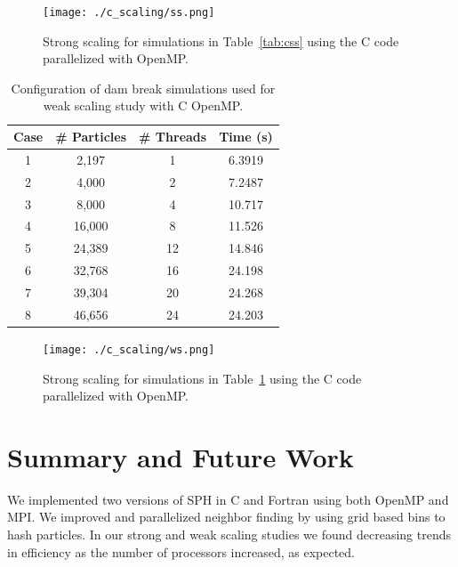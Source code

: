 \documentclass{scrartcl}
\begin{document}
    
        \begin{figure}[h!]
        	\begin{center}
        		\texttt{[image: ./c\_scaling/ss.png]}
        		\caption{Strong scaling for simulations in Table~\ref{tab:css} using the C code parallelized with OpenMP.}
        		\label{fig:ss_c_omp}
        	\end{center}
        \end{figure}

            \begin{table}[h!]
            	\begin{center}
            		\begin{tabular}{| c | c | c | c |}
            			\hline
            			Case & \# Particles & \# Threads & Time (s) \\ \hline
            			1 &  2,197 &  1 & 6.3919 \\ \hline		  		
            			2 &  4,000 &  2 & 7.2487 \\ \hline		  		
            			3 &  8,000 &  4 & 10.717 \\ \hline		  		
            			4 & 16,000 &  8 & 11.526 \\ \hline		  		
            			5 & 24,389 & 12 & 14.846 \\ \hline		  		
            			6 & 32,768 & 16 & 24.198 \\ \hline		  		
            			7 & 39,304 & 20 & 24.268 \\ \hline		  		
            			8 & 46,656 & 24 & 24.203 \\ \hline		  		
            		\end{tabular}
            		\caption{Configuration of dam break simulations used for weak scaling study with C OpenMP.}
            		\label{tab:cws}
            	\end{center}
            \end{table}
    \begin{figure}[h!]
    	\begin{center}
    		\texttt{[image: ./c\_scaling/ws.png]}
    		\caption{Strong scaling for simulations in Table~\ref{tab:cws} using the C code parallelized with OpenMP.}
    		\label{fig:ws_c_omp}
    	\end{center}
    \end{figure}
    
  
\section{Summary and Future Work}
We implemented two versions of SPH in C and Fortran using both OpenMP and MPI. We improved and parallelized neighbor finding by using grid based bins to hash particles. In our strong and weak scaling studies we found decreasing trends in efficiency as the number of processors increased, as expected.
\end{document}
